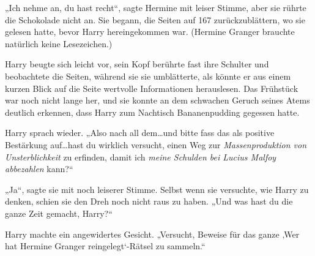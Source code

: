 
„Ich nehme an, du hast recht“, sagte Hermine mit leiser Stimme, aber sie rührte die Schokolade nicht an. Sie begann, die Seiten auf 167 zurückzublättern, wo sie gelesen hatte, bevor Harry hereingekommen war. (Hermine Granger brauchte natürlich keine Lesezeichen.)

Harry beugte sich leicht vor, sein Kopf berührte fast ihre Schulter und beobachtete die Seiten, während sie sie umblätterte, als könnte er aus einem kurzen Blick auf die Seite wertvolle Informationen herauslesen. Das Frühstück war noch nicht lange her, und sie konnte an dem schwachen Geruch seines Atems deutlich erkennen, dass Harry zum Nachtisch Bananenpudding gegessen hatte.

Harry sprach wieder. „Also nach all dem…und bitte fass das als positive Bestärkung auf…hast du wirklich versucht, einen Weg zur \emph{Massenproduktion von Unsterblichkeit} zu erfinden, damit ich \emph{meine Schulden bei Lucius Malfoy abbezahlen} kann?“

„Ja“, sagte sie mit noch leiserer Stimme. Selbst wenn sie versuchte, wie Harry zu denken, schien sie den Dreh noch nicht raus zu haben. „Und was hast du die ganze Zeit gemacht, Harry?“

Harry machte ein angewidertes Gesicht. „Versucht, Beweise für das ganze ‚Wer hat Hermine Granger reingelegt‘-Rätsel zu sammeln.“

